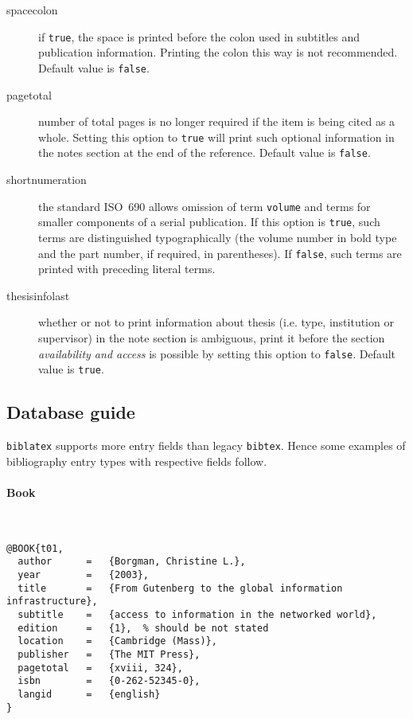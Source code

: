 \documentclass[a4paper,10pt]{ltxdockit}
\def\t|#1|{\texttt{#1}}
\def\c#1{%
\hangpara{3em}{1}%
\fullcite{#1}}
\begin{document}
\begin{description}
  \item[spacecolon] if \t|true|, the space is printed before the colon
  used in subtitles and publication information. Printing the colon this way
  is not recommended. Default value is \t|false|.

  \item[pagetotal] number of total pages is no longer required if the item
  is being cited as a whole. Setting this option to \t|true| will print
  such optional information in the notes section at the end of the reference.
  Default value is \t|false|.\label{pkg:opt:iso690:pp}

  \item[shortnumeration] the standard ISO~690 allows omission of term
  \t|volume| and terms for smaller components of a serial publication.
  If this option is \t|true|, such terms are distinguished typographically
  (the volume number in bold type and the part number, if required, in
  parentheses). If \t|false|, such terms are printed with preceding
  literal terms.

  \item[thesisinfolast] whether or not to print information about
  thesis (i.e. type, institution or supervisor) in the note section
  is ambiguous, print it before the section \textit{availability
  and access} is possible by setting this option to \t|false|.
  Default value is \t|true|.
\end{description}


\subsection{Database guide}

\t|biblatex| supports more entry fields than legacy \t|bibtex|. Hence
some examples of bibliography entry types with respective fields follow.


\paragraph{Book} \hfill\\

\c{t01}
\begin{verbatim}
@BOOK{t01,
  author      =   {Borgman, Christine L.}, 
  year        =   {2003},
  title       =   {From Gutenberg to the global information infrastructure}, 
  subtitle    =   {access to information in the networked world},
  edition     =   {1},  % should be not stated
  location    =   {Cambridge (Mass)}, 
  publisher   =   {The MIT Press},
  pagetotal   =   {xviii, 324},
  isbn        =   {0-262-52345-0},
  langid      =   {english}
}
\end{verbatim} 
\end{document}
